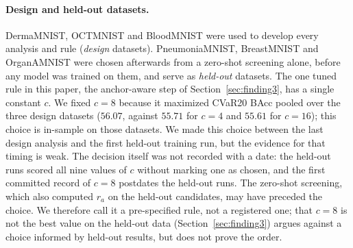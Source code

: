 \paragraph{Design and held-out datasets.}
DermaMNIST, OCTMNIST and BloodMNIST were used to develop every analysis and rule (\emph{design} datasets).
PneumoniaMNIST, BreastMNIST and OrganAMNIST were chosen afterwards from a zero-shot screening alone,
before any model was trained on them, and serve as \emph{held-out} datasets.
The one tuned rule in this paper, the anchor-aware step of Section~\ref{sec:finding3},
has a single constant $c$. We fixed $c = 8$ because it maximized CVaR20 BAcc pooled over the three design datasets
($56.07$, against $55.71$ for $c = 4$ and $55.61$ for $c = 16$); this choice is in-sample on those datasets.
We made this choice between the last design analysis and the first held-out training run, but the evidence for that timing is weak.
The decision itself was not recorded with a date: the held-out runs scored all nine values of $c$ without marking one as chosen,
and the first committed record of $c = 8$ postdates the held-out runs.
The zero-shot screening, which also computed $r_a$ on the held-out candidates, may have preceded the choice.
We therefore call it a pre-specified rule, not a registered one; that $c = 8$ is not the best value on the held-out data
(Section~\ref{sec:finding3}) argues against a choice informed by held-out results, but does not prove the order.
